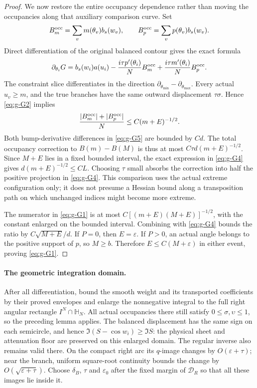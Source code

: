 \documentclass[11pt]{article}
\numberwithin{equation}{section}
\theoremstyle{remark}\newtheorem{remark}[theorem]{Remark}
\begin{document}
\begin{proof}
We now restore the entire occupancy dependence rather than
moving the occupancies along that auxiliary comparison curve.
Set
\[
 B_m^{\rm occ}=\sum_v m(\theta_v)b_s(w_v),\qquad
 B_p^{\rm occ}=\sum_v p(\theta_v)b_s(w_v).
\]
Direct differentiation of the original balanced contour gives
the exact formula
\begin{equation}\label{eq:g-G5}
\partial_{\theta_i}G
 =b_s(w_i)a(u_i)
 -\frac{i\tau p'(\theta_i)}N B_m^{\rm occ}
 +\frac{i\tau m'(\theta_i)}N B_p^{\rm occ}.
\end{equation}
The constraint slice differentiates in the direction
$\partial_{\theta_{\min}}-\partial_{\theta_{\max}}$.
Every actual $u_v\ge m$, and the true branches have the same
outward displacement $\tau\sigma$.  Hence \eqref{eq:g-G2} implies
\[
 \frac{|B_m^{\rm occ}|+|B_p^{\rm occ}|}{N}
 \le C(m+E)^{-1/2}.
\]
Both bump-derivative differences in \eqref{eq:g-G5} are bounded by $Cd$.
The total occupancy correction to $B(m)-B(M)$ is thus at most
$C\tau d(m+E)^{-1/2}$.
Since $M+E$ lies in a fixed bounded interval, the exact
expression in \eqref{eq:g-G4} gives
$d(m+E)^{-1/2}\le CL$.  Choosing $\tau$ small absorbs the
correction into half the positive projection in \eqref{eq:g-G4}.
This comparison uses the actual extreme configuration only;
it does not presume a Hessian bound along a transposition path
on which unchanged indices might become more extreme.

The numerator in \eqref{eq:g-G1} is at most
$C[(m+E)(M+E)]^{-1/2}$, with the constant enlarged on the bounded interval.
Combining with \eqref{eq:g-G4} bounds the ratio by $C\sqrt{M+E}/d$.
If $P=0$, then $E=\varepsilon$.  If $P>0$, an actual angle
belongs to the positive support of $p$, so $M\ge b$.
Therefore $E\le C(M+\varepsilon)$ in either event, proving
\eqref{eq:g-G1}.
\end{proof}



\paragraph{The geometric integration domain.}\label{par:right-rectangle}
After all differentiation, bound the smooth weight and its
transported coefficients by their proved envelopes and enlarge
the nonnegative integral to the full right angular rectangle
$I^N\cap\mathbb H_N$. All actual occupancies there still satisfy
$0\le\sigma,\upsilon\le1$, so the preceding lemma applies.
The balanced displacement has the same sign on each semicircle,
and hence $\Im(S-\cos w_i)\ge\Im S$: the physical sheet and
attenuation floor are preserved on this enlarged domain.
The regular inverse also remains valid there. On the compact
right arc its $q$-image changes by $O(\varepsilon+\tau)$;
near the branch, uniform square-root continuity bounds the
change by $O(\sqrt{\varepsilon+\tau})$. Choose $\delta_B$,
$\tau$ and $\varepsilon_0$ after the fixed margin of
$\mathcal D_R$ so that all these images lie inside it.
\end{document}
